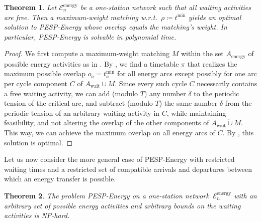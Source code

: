 \documentclass[11pt,a4paper]{article}
\newcommand{\dotcup}{\mathbin{\dot\cup}}
\newcommand{\wait}{\mathrm{wait}}
\newcommand{\energy}{\mathrm{energy}}
\newcommand{\energyact}{M}               %
\newcommand{\possenergyact}{A_{\energy}} %
\newcommand{\pespenergy}{PESP-Energy\xspace}
\newcommand{\osn}{one-station network\xspace}
\newcommand{\w}{\rho} %
\newcommand{\cE}{\mathcal{E}}
\newtheorem{theorem}{Theorem}[section]
\theoremstyle{definition}
\theoremstyle{remark}
\begin{document}
\begin{theorem}\label{thm:pesp-energy-complexity-free-waiting}
    Let $\cE_n^{\energy}$ be a \osn such that all waiting activities are free. Then a maximum-weight matching w.r.t.~$\w \coloneqq t^ {\min}$ yields an optimal solution to \pespenergy whose overlap equals the matching's weight. In particular, \pespenergy is solvable in polynomial time.
\end{theorem}
\begin{proof}
    We first compute a maximum-weight matching $\energyact$ within the set $\possenergyact$ of possible energy activities as in . By , we find a timetable $\pi$ that realizes the maximum possible overlap $o_a = t_a^{\min}$ for all energy arcs except possibly for one arc per cycle component $C$ of $A_\wait \dotcup \energyact$. Since every such cycle $C$ necessarily contains a free waiting activity, we can add (modulo $T$) any number $\delta$ to the periodic tension of the critical arc, and subtract (modulo $T$) the same number $\delta$ from the periodic tension of an arbitrary waiting activity in $C$, while maintaining feasibility, and not altering the overlap of the other components of $A_\wait \dotcup \energyact$. This way, we can achieve the maximum overlap on all energy arcs of $C$. By , this solution is optimal.
\end{proof}



Let us now consider the more general case of \pespenergy with restricted waiting times and a restricted set of compatible arrivals and departures between which an energy transfer is possible.


\begin{theorem}
    \label{thm:pesp-energy-subset-hardness}
	The problem \pespenergy on a \osn~$\cE_n^{\energy}$ with an arbitrary set of possible energy activities and arbitrary bounds on the waiting activities is NP-hard. 
\end{theorem}
\end{document}
